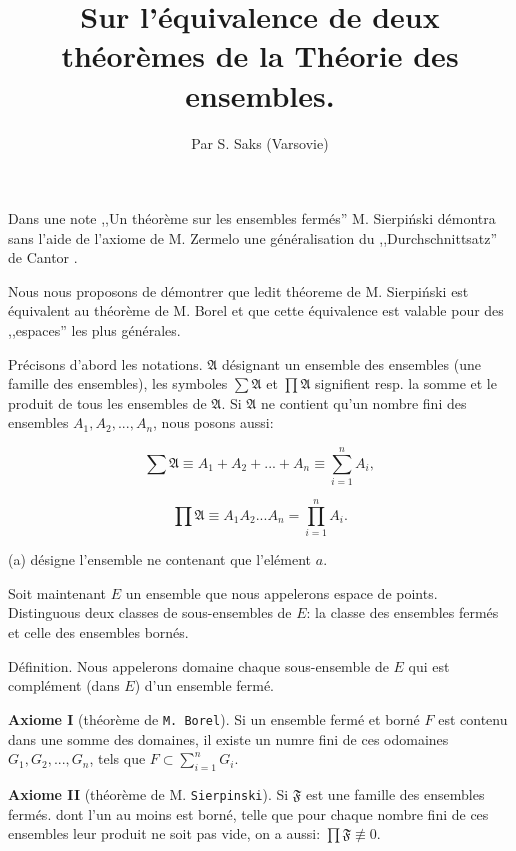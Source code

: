 \documentclass[12pt,french]{article}
\title{Sur l'\'equivalence de deux th\'eor\`emes de la Th\'eorie des ensembles.}
\date{}
\author{Par
S. Saks (Varsovie)}
\begin{document}
\maketitle

Dans une note ,,Un th\'eor\`eme sur les ensembles ferm\'es'' \footnotemark{} M. Sierpi\'nski d\'emontra sans l'aide de l'axiome de M. Zermelo une g\'en\'eralisation  du ,,Durchschnittsatz'' de Cantor \footnotemark{}.

Nous nous proposons de d\'emontrer que ledit th\'eoreme de M. Sierpi\'nski est \'equivalent au th\'eor\`eme de M. Borel et que cette \'equivalence est valable pour des ,,espaces'' les plus g\'en\'erales.

Pr\'ecisons d'abord les notations. $\mathfrak{A}$ d\'esignant un ensemble des ensembles (une famille des ensembles), les symboles $\sum \mathfrak{A}$ et $\prod \mathfrak{A}$ signifient resp. la somme et le produit de tous les ensembles de $\mathfrak{A}$. Si $\mathfrak{A}$ ne contient qu'un nombre fini des ensembles $A_1, A_2, ..., A_n$, nous posons aussi:

$$\sum \mathfrak{A} \equiv A_1 + A_2 + ... + A_n \equiv \sum_{i=1}^{n}A_i,$$

$$\prod \mathfrak{A} \equiv A_1 A_2 ... A_n = \prod_{i=1}^{n}A_i.$$

(a) d\'esigne l'ensemble ne contenant que l'el\'ement $a$.

Soit maintenant $E$ un ensemble que nous appelerons espace de points. Distinguous deux classes de sous-ensembles de $E$: la classe des ensembles ferm\'es et celle des ensembles born\'es.

D\'efinition. Nous appelerons domaine chaque sous-ensemble de $E$ qui est compl\'ement (dans $E$) d'un ensemble ferm\'e.



\textbf{Axiome I} (th\'eor\`eme de \texttt{M. Borel}). Si un ensemble ferm\'e et born\'e $F$ est contenu dans une somme des domaines, il existe un numre fini de ces odomaines $G_1, G_2, ..., G_n$, tels que $F \subset \sum_{i=1}^{n}G_i.$

\textbf{Axiome II} (th\'eor\`eme de M. \texttt{Sierpinski}). Si $\mathfrak F$ est une famille des ensembles ferm\'es. dont l'un au moins est born\'e, telle que pour chaque nombre fini de ces ensembles leur produit ne soit pas vide, on a aussi: $\prod \mathfrak{F} \not\equiv 0$.
\end{document}
